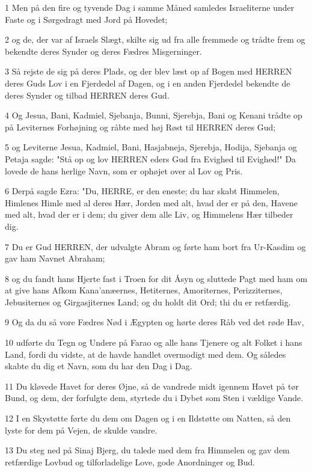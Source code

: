 \par 1 Men på den fire og tyvende Dag i samme Måned samledes Israeliterne under Faste og i Sørgedragt med Jord på Hovedet;
\par 2 og de, der var af Israels Slægt, skilte sig ud fra alle fremmede og trådte frem og bekendte deres Synder og deres Fædres Misgerninger.
\par 3 Så rejste de sig på deres Plads, og der blev læst op af Bogen med HERREN deres Guds Lov i en Fjerdedel af Dagen, og i en anden Fjerdedel bekendte de deres Synder og tilbad HERREN deres Gud.
\par 4 Og Jesua, Bani, Kadmiel, Sjebanja, Bunni, Sjerebja, Bani og Kenani trådte op på Leviternes Forhøjning og råbte med høj Røst til HERREN deres Gud;
\par 5 og Leviterne Jesua, Kadmiel, Bani, Hasjabneja, Sjerebja, Hodija, Sjebanja og Petaja sagde: "Stå op og lov HERREN eders Gud fra Evighed til Evighed!" Da lovede de hans herlige Navn, som er ophøjet over al Lov og Pris.
\par 6 Derpå sagde Ezra: "Du, HERRE, er den eneste; du har skabt Himmelen, Himlenes Himle med al deres Hær, Jorden med alt, hvad der er på den, Havene med alt, hvad der er i dem; du giver dem alle Liv, og Himmelens Hær tilbeder dig.
\par 7 Du er Gud HERREN, der udvalgte Abram og førte ham bort fra Ur-Kasdim og gav ham Navnet Abraham;
\par 8 og du fandt hans Hjerte fast i Troen for dit Åsyn og sluttede Pagt med ham om at give hans Afkom Kana'anæernes, Hetiternes, Amoriternes, Perizziternes, Jebusiternes og Girgasjiternes Land; og du holdt dit Ord; thi du er retfærdig.
\par 9 Og da du så vore Fædres Nød i Ægypten og hørte deres Råb ved det røde Hav,
\par 10 udførte du Tegn og Undere på Farao og alle hans Tjenere og alt Folket i hans Land, fordi du vidste, at de havde handlet overmodigt med dem. Og således skabte du dig et Navn, som du har den Dag i Dag.
\par 11 Du kløvede Havet for deres Øjne, så de vandrede midt igennem Havet på tør Bund, og dem, der forfulgte dem, styrtede du i Dybet som Sten i vældige Vande.
\par 12 I en Skystøtte førte du dem om Dagen og i en Ildstøtte om Natten, så den lyste for dem på Vejen, de skulde vandre.
\par 13 Du steg ned på Sinaj Bjerg, du talede med dem fra Himmelen og gav dem retfærdige Lovbud og tilforladelige Love, gode Anordninger og Bud.
